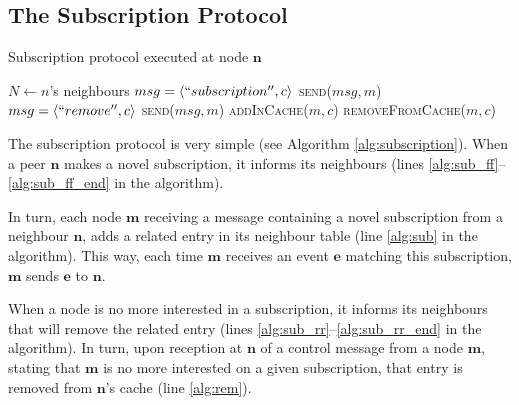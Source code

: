 \documentclass[10pt, conference, compsocconf]{IEEEtran}
\begin{document}
\subsection{The Subscription Protocol}

\begin{algorithm}[t]
\caption{Subscription protocol executed at node $\mathbf{n}$}
\label{alg:subscription}
\begin{small}
\begin{algorithmic}[1]
\STATE $N \leftarrow n$'s neighbours 
\STATE
{}\label{alg:sub_ff}
\STATE $msg = \langle ``subscription'', c \rangle$
 \hfill{}
   \STATE \textsc{send}($msg, m$)\ENDFOR \label{alg:sub_ff_end}
\STATE
{}\label{alg:sub_rr}
\STATE $msg = \langle ``remove'', c \rangle$
 \hfill{}
  \STATE \textsc{send}($msg, m$)\ENDFOR \label{alg:sub_rr_end}
\STATE
{}
\STATE \textsc{addInCache}($m, c$)\hfill{}\label{alg:sub}
\ELSE \hfill{}\label{alg:sub_rr_sent}
\STATE \textsc{removeFromCache}($m, c$)\label{alg:rem}
\ENDIF
\end{algorithmic}
\end{small}
\end{algorithm}


The subscription protocol is very simple (see Algorithm \ref{alg:subscription}). When a peer $\mathbf{n}$ makes a novel subscription, it informs its neighbours (lines \ref{alg:sub_ff}--\ref{alg:sub_ff_end} in the algorithm). 

In turn, each node $\mathbf{m}$ receiving a message containing a novel subscription from a neighbour $\mathbf{n}$, adds a related entry in its neighbour table (line \ref{alg:sub} in the algorithm). This way, each time $\mathbf{m}$ receives an event $\mathbf{e}$ matching this subscription, $\mathbf{m}$ sends $\mathbf{e}$ to $\mathbf{n}$.

When a node is no more interested in a subscription, it informs its neighbours that will remove the related entry (lines \ref{alg:sub_rr}--\ref{alg:sub_rr_end} in the algorithm). In turn, upon reception at $\mathbf{n}$ of a control message from a node $\mathbf{m}$, stating that $\mathbf{m}$ is no more interested on a given subscription, that entry is removed from $\mathbf{n}$'s cache (line \ref{alg:rem}).
\end{document}
